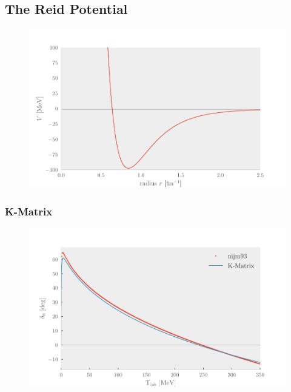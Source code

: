 \subsection{The Reid Potential}

\begin{figure}[ht]
  \centering
  \includegraphics[]{Figures/yukawa.pdf}
  \caption{\label{fig:yukawa} }
\end{figure}

\subsubsection{K-Matrix}
\begin{figure}[ht]
  \centering
  \includegraphics[]{Figures/kmatrix.pdf}
  \caption{\label{fig:kmatrix} }
\end{figure}

